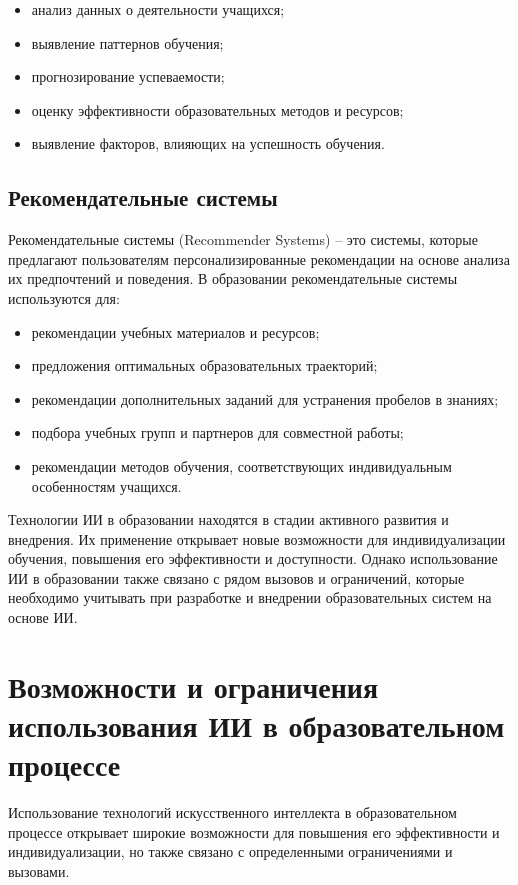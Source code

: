 \documentclass[a4paper,14pt]{extreport}
\begin{document}
\begin{itemize}
    \item анализ данных о деятельности учащихся;
    \item выявление паттернов обучения;
    \item прогнозирование успеваемости;
    \item оценку эффективности образовательных методов и ресурсов;
    \item выявление факторов, влияющих на успешность обучения.
\end{itemize}

\subsection{Рекомендательные системы}

Рекомендательные системы (Recommender Systems) – это системы, которые предлагают пользователям персонализированные рекомендации на основе анализа их предпочтений и поведения. В образовании рекомендательные системы используются для:

\begin{itemize}
    \item рекомендации учебных материалов и ресурсов;
    \item предложения оптимальных образовательных траекторий;
    \item рекомендации дополнительных заданий для устранения пробелов в знаниях;
    \item подбора учебных групп и партнеров для совместной работы;
    \item рекомендации методов обучения, соответствующих индивидуальным особенностям учащихся.
\end{itemize}

Технологии ИИ в образовании находятся в стадии активного развития и внедрения. Их применение открывает новые возможности для индивидуализации обучения, повышения его эффективности и доступности. Однако использование ИИ в образовании также связано с рядом вызовов и ограничений, которые необходимо учитывать при разработке и внедрении образовательных систем на основе ИИ.
\section{Возможности и ограничения использования ИИ в образовательном процессе}

Использование технологий искусственного интеллекта в образовательном процессе открывает широкие возможности для повышения его эффективности и индивидуализации, но также связано с определенными ограничениями и вызовами.
\end{document}
